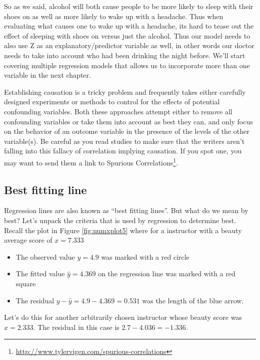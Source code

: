 \documentclass[12pt,]{krantz}
\providecommand{\tightlist}{%
  \setlength{\itemsep}{0pt}\setlength{\parskip}{0pt}}
\renewcommand{\href}[2]{#2\footnote{\url{#1}}}
\begin{document}
So as we said, alcohol will both cause people to be more likely to sleep
with their shoes on as well as more likely to wake up with a headache.
Thus when evaluating what causes one to wake up with a headache, its
hard to tease out the effect of sleeping with shoes on versus just the
alcohol. Thus our model needs to also use Z as an explanatory/predictor
variable as well, in other words our doctor needs to take into account
who had been drinking the night before. We'll start covering multiple
regression models that allows us to incorporate more than one variable
in the next chapter.

Establishing causation is a tricky problem and frequently takes either
carefully designed experiments or methods to control for the effects of
potential confounding variables. Both these approaches attempt either to
remove all confounding variables or take them into account as best they
can, and only focus on the behavior of an outcome variable in the
presence of the levels of the other variable(s). Be careful as you read
studies to make sure that the writers aren't falling into this fallacy
of correlation implying causation. If you spot one, you may want to send
them a link to
\href{http://www.tylervigen.com/spurious-correlations}{Spurious
Correlations}.

\subsection{Best fitting line}\label{leastsquares}

Regression lines are also known as ``best fitting lines''. But what do
we mean by best? Let's unpack the criteria that is used by regression to
determine best. Recall the plot in Figure \ref{fig:numxplot5} where for
a instructor with a beauty average score of \(x=7.333\)

\begin{itemize}
\tightlist
\item
  The observed value \(y=4.9\) was marked with a red circle
\item
  The fitted value \(\widehat{y} = 4.369\) on the regression line was
  marked with a red square
\item
  The residual \(y-\widehat{y} = 4.9-4.369 = 0.531\) was the length of
  the blue arrow.
\end{itemize}

Let's do this for another arbitrarily chosen instructor whose beauty
score was \(x=2.333\). The residual in this case is
\(2.7 - 4.036 = -1.336\).
\end{document}
